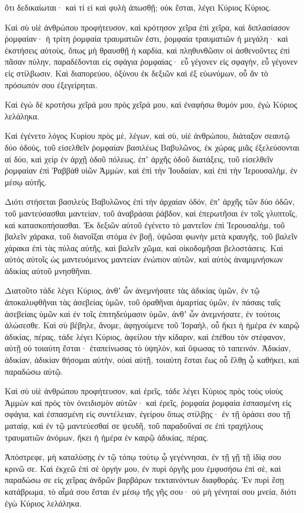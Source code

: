 {ὅτι δεδικαίωται· καὶ τί εἰ καὶ φυλὴ ἀπωσθῇ; οὐκ ἔσται, λέγει Κύριος Κύριος.
\par }{\PP {}Καὶ σὺ υἱὲ ἀνθρώπου προφήτευσον, καὶ κρότησον χεῖρα ἐπὶ χεῖρα, καὶ διπλασίασον ῥομφαίαν· ἡ τρίτη ῥομφαία τραυματιῶν ἐστι, ῥομφαία τραυματιῶν ἡ μεγάλη· καὶ ἐκστήσεις αὐτοὺς,
ὅπως μὴ θραυσθῇ ἡ καρδία, καὶ πληθυνθῶσιν οἱ ἀσθενοῦντες ἐπὶ πᾶσαν πύλην, παραδέδονται εἰς σφάγια ῥομφαίας· εὖ γέγονεν εἰς σφαγὴν, εὖ γέγονεν εἰς στίλβωσιν.
Καὶ διαπορεύου, ὀξύνου ἐκ δεξιῶν καὶ ἐξ εὐωνύμων, οὗ ἄν τὸ πρόσωπόν σου ἐξεγείρηται.
\par }{\PP {}Καὶ ἐγὼ δὲ κροτήσω χεῖρά μου πρὸς χεῖρά μου, καὶ ἐναφήσω θυμόν μου, ἐγὼ Κύριος λελάληκα.
\par }{\PP {}Καὶ ἐγένετο λόγος Κυρίου πρὸς μὲ, λέγων,
καὶ σὺ, υἱὲ ἀνθρώπου, διάταξον σεαυτῷ δύο ὁδοὺς, τοῦ εἰσελθεῖν ῥομφαίαν βασιλέως Βαβυλῶνος, ἐκ χώρας μιᾶς ἐξελεύσονται αἱ δύο, καὶ χεὶρ ἐν ἀρχῇ ὁδοῦ πόλεως, ἐπʼ ἀρχῆς ὁδοῦ διατάξεις,
τοῦ εἰσελθεῖν ῥομφαίαν ἐπὶ Ῥαββὰθ υἱῶν Ἀμμὼν, καὶ ἐπὶ τὴν Ἰουδαίαν, καὶ ἐπὶ τὴν Ἱερουσαλὴμ, ἐν μέσῳ αὐτῆς.
\par }{\PP {}Διότι στήσεται βασιλεὺς Βαβυλῶνος ἐπὶ τὴν ἀρχαίαν ὁδόν, ἐπʼ ἀρχῆς τῶν δύο ὁδῶν, τοῦ μαντεύσασθαι μαντείαν, τοῦ ἀναβράσαι ῥάβδον, καὶ ἐπερωτῆσαι ἐν τοῖς γλυπτοῖς, καὶ κατασκοπήσασθαι.
Ἐκ δεξιῶν αὐτοῦ ἐγένετο τὸ μαντεῖον ἐπὶ Ἱερουσαλὴμ, τοῦ βαλεῖν χάρακα, τοῦ διανοῖξαι στόμα ἐν βοῇ, ὑψῶσαι φωνὴν μετὰ κραυγῆς, τοῦ βαλεῖν χάρακα ἐπὶ τὰς πύλας αὐτῆς, καὶ βαλεῖν χῶμα, καὶ οἰκοδομῆσαι βελοστάσεις.
Καὶ αὐτός αὐτοῖς ὡς μαντευόμενος μαντείαν ἐνώπιον αὐτῶν, καὶ αὐτὸς ἀναμιμνήσκων ἀδικίας αὐτοῦ μνησθῆναι.
\par }{\PP {}Διατοῦτο τάδε λέγει Κύριος, ἀνθʼ ὧν ἀνεμνήσατε τὰς ἀδικίας ὑμῶν, ἐν τῷ ἀποκαλυφθῆναι τὰς ἀσεβείας ὑμῶν, τοῦ ὀραθῆναι ἁμαρτίας ὑμῶν, ἐν πάσαις ταῖς ἀσεβείαις ὑμῶν καὶ ἐν τοῖς ἐπιτηδεύμασιν ὑμῶν, ἀνθʼ ὧν ἀνεμνήσατε, ἐν τούτοις ἁλώσεσθε.
Καὶ σὺ βέβηλε, ἄνομε, ἀφηγούμενε τοῦ Ἰσραὴλ, οὗ ἥκει ἡ ἡμέρα ἐν καιρῷ ἀδικίας, πέρας,
τάδε λέγει Κύριος, ἀφείλου τὴν κίδαριν, καὶ ἐπέθου τὸν στέφανον, αὐτῇ οὐ τοιαύτη ἔσται· ἐταπείνωσας τὸ ὑψηλὸν, καὶ ὕψωσας τὸ ταπεινόν.
Ἀδικίαν, ἀδικίαν, ἀδικίαν θήσομαι αὐτὴν, οὐαὶ αὐτῇ, τοιαύτη ἔσται ἕως οὗ ἔλθῃ ᾧ καθήκει, καὶ παραδώσω αὐτῷ.
\par }{\PP {}Καὶ σὺ υἱὲ ἀνθρώπου προφήτευσον, καὶ ἐρεῖς, τάδε λέγει Κύριος πρὸς τοὺς υἱοὺς Ἀμμὼν καὶ πρὸς τὸν ὀνειδισμὸν αὐτῶν· καὶ ἐρεῖς, ῥομφαία ῥομφαία ἐσπασμένη εἰς σφάγια, καὶ ἐσπασμένη εἰς συντέλειαν, ἐγείρου ὅπως στίλβῃς·
ἐν τῇ ὁράσει σου τῇ ματαίᾳ, καὶ ἐν τῷ μαντεύεσθαί σε ψευδῆ, τοῦ παραδοῦναί σε ἐπὶ τραχήλους τραυματιῶν ἀνόμων, ἥκει ἡ ἡμέρα ἐν καιρῷ ἀδικίας, πέρας.
\par }{\PP {}Ἀπόστρεφε, μὴ καταλύσῃς ἐν τῷ τόπῳ τούτῳ ᾧ γεγέννησαι, ἐν τῇ γῇ τῇ ἰδίᾳ σου κρινῶ σε.
Καὶ ἐκχεῶ ἐπὶ σὲ ὀργήν μου, ἐν πυρὶ ὀργῆς μου ἐμφυσήσω ἐπὶ σὲ, καὶ παραδώσω σε εἰς χεῖρας ἀνδρῶν βαρβάρων τεκταινόντων διαφθοράς.
Ἐν πυρὶ ἔσῃ κατάβρωμα, τὸ αἷμά σου ἔσται ἐν μέσῳ τῆς γῆς σου· οὐ μὴ γένηταί σου μνεία, διότι ἐγὼ Κύριος λελάληκα.

}
